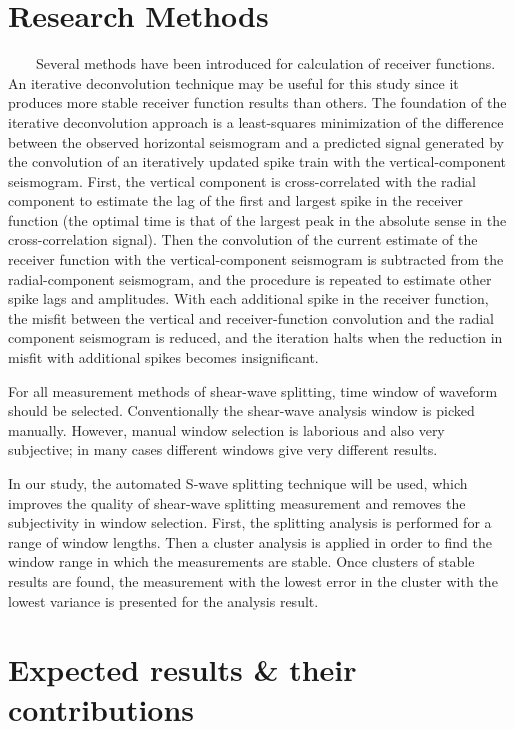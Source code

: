 \documentclass{article}
\begin{document}
\section{Research Methods} 
   

~~~~Several methods have been introduced for calculation of receiver functions. An iterative deconvolution technique may be useful for this study since it produces more stable receiver function results than others. The foundation of the iterative deconvolution approach is a least-squares minimization of the difference between the observed horizontal seismogram and a predicted signal generated by the convolution of an iteratively updated spike train with the vertical-component seismogram. First, the vertical component is cross-correlated with the radial component to estimate the lag of the first and largest spike in the receiver function (the optimal time is that of the largest peak in the absolute sense in the cross-correlation signal). Then the convolution of the current estimate of the receiver function with the vertical-component seismogram is subtracted from the radial-component seismogram, and the procedure is repeated to estimate other spike lags and amplitudes. With each additional spike in the receiver function, the misfit between the vertical and receiver-function convolution and the radial component seismogram is reduced, and the iteration halts when the reduction in misfit with additional spikes becomes insignificant.
\newline

    For all measurement methods of shear-wave splitting, time window of waveform should be selected. Conventionally the shear-wave analysis window is picked manually. However, manual window selection is laborious and also very subjective; in many cases different windows give very different results.
\newline

    In our study, the automated S-wave splitting technique will be used, which improves the quality of shear-wave splitting measurement and removes the subjectivity in window selection. First, the splitting analysis is performed for a range of window lengths. Then a cluster analysis is applied in order to find the window range in which the measurements are stable. Once clusters of stable results are found, the measurement with the lowest error in the cluster with the lowest variance is presented for the analysis result.


\section{Expected results \& their contributions}
  
\end{document}
